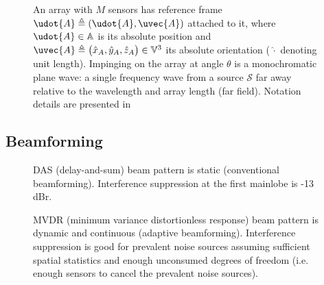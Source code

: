{\begin{figure}[!t]\centering
{}
\caption{
An array with $M$ sensors has reference frame $\udot{A} \triangleq (\udot{A},\uvec{A})$ attached to it, where $\udot{A}\in\mathbb{A}$ is its absolute position and $\uvec{A}\triangleq\big(\hat{x}_{A},\hat{y}_{A},\hat{z}_{A}\big)\in\mathbb{V}^3$ its absolute orientation (\,$\hat{\cdot}$ denoting unit length). Impinging on the array at angle $\theta$ is a monochromatic plane wave: a single frequency wave from a source $\mathcal{S}$ far away relative to the wavelength and array length (far field). Notation details are presented in 
}%
\label{2_fig_geometry}
\end{figure}

\subsection{Beamforming}

\begin{figure}[tp]
\caption{DAS (delay-and-sum) beam pattern is static (conventional beamforming). Interference suppression at the first mainlobe is -13\,dBr.}%
\label{2_fig_scenario_das}
\end{figure}

\begin{figure}[tp]
\caption{MVDR (minimum variance distortionless response) beam pattern is dynamic and continuous (adaptive beamforming). Interference suppression is good for prevalent noise sources assuming sufficient spatial statistics and enough unconsumed degrees of freedom (i.e. enough sensors to cancel the prevalent noise sources).}%
\label{2_fig_scenario_mvdr}
\end{figure}

}
